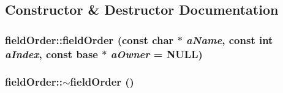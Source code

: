 \subsection{Constructor \& Destructor Documentation}
\hypertarget{classfield_order_ae6d0b710f8f80d249e487335937cd3d7}{
\subsubsection[{fieldOrder}]{\setlength{\rightskip}{0pt plus 5cm}fieldOrder::fieldOrder (const char $\ast$ {\em aName}, \/  const int {\em aIndex}, \/  const {\bf base} $\ast$ {\em aOwner} = {\ttfamily NULL})}}
\label{classfield_order_ae6d0b710f8f80d249e487335937cd3d7}
\hypertarget{classfield_order_a0ec46bad257b1812160bcb4e964a3b31}{
\subsubsection[{$\sim$fieldOrder}]{\setlength{\rightskip}{0pt plus 5cm}fieldOrder::$\sim$fieldOrder ()}}
\label{classfield_order_a0ec46bad257b1812160bcb4e964a3b31}


